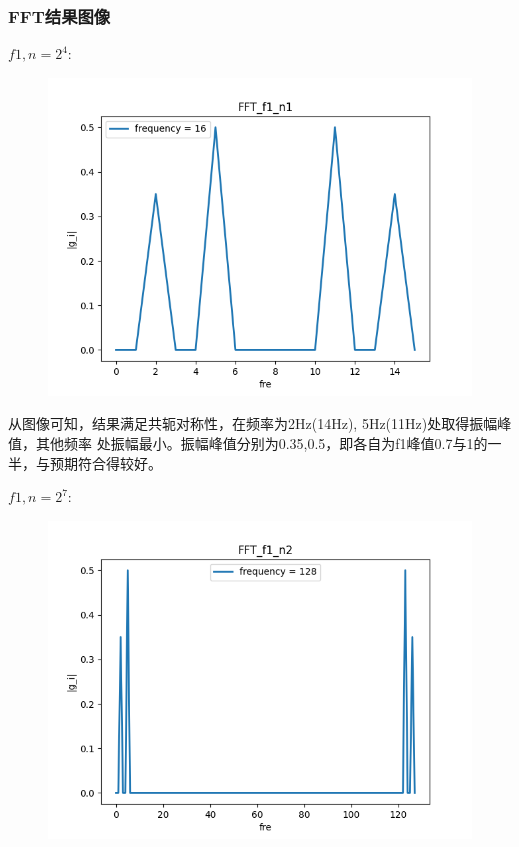 \documentclass[12pt,a4paper,oneside]{article}
\begin{document}
\subsubsection{FFT结果图像}
$f1, n=2^4:$
\begin{figure}[H]
    \centering
    \includegraphics[scale = 0.85]{../res/figs/FFT_f1_n1.png}
\end{figure}
从图像可知，结果满足共轭对称性，在频率为2Hz(14Hz), 5Hz(11Hz)处取得振幅峰值，其他频率
处振幅最小。振幅峰值分别为0.35,0.5，即各自为f1峰值0.7与1的一半，与预期符合得较好。
\par
$f1, n = 2^7:$
\begin{figure}[H]
    \centering
    \includegraphics[scale = 0.85]{../res/figs/FFT_f1_n2.png}
\end{figure}
\end{document}
